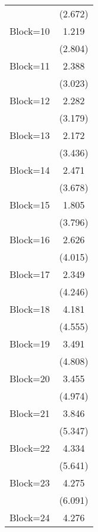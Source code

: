 {\begin{tabular}{l*{1}{c}}
                    &     (2.672)         \\
[1em]
Block=10            &       1.219         \\
                    &     (2.804)         \\
[1em]
Block=11            &       2.388         \\
                    &     (3.023)         \\
[1em]
Block=12            &       2.282         \\
                    &     (3.179)         \\
[1em]
Block=13            &       2.172         \\
                    &     (3.436)         \\
[1em]
Block=14            &       2.471         \\
                    &     (3.678)         \\
[1em]
Block=15            &       1.805         \\
                    &     (3.796)         \\
[1em]
Block=16            &       2.626         \\
                    &     (4.015)         \\
[1em]
Block=17            &       2.349         \\
                    &     (4.246)         \\
[1em]
Block=18            &       4.181         \\
                    &     (4.555)         \\
[1em]
Block=19            &       3.491         \\
                    &     (4.808)         \\
[1em]
Block=20            &       3.455         \\
                    &     (4.974)         \\
[1em]
Block=21            &       3.846         \\
                    &     (5.347)         \\
[1em]
Block=22            &       4.334         \\
                    &     (5.641)         \\
[1em]
Block=23            &       4.275         \\
                    &     (6.091)         \\
[1em]
Block=24            &       4.276         \\

\end{tabular}}
